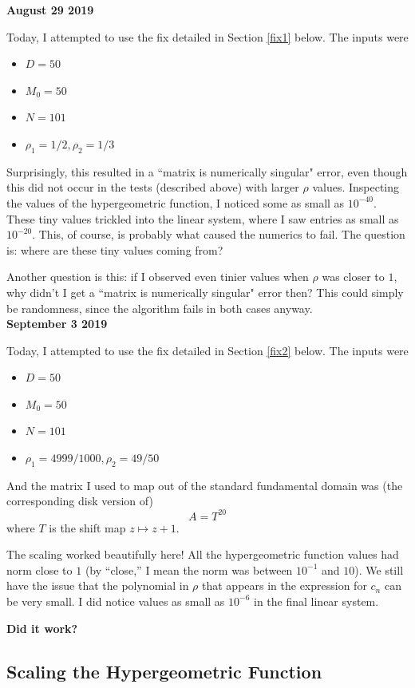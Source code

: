 \documentclass[]{article}
\begin{document}
\noindent \textbf{August 29 2019}

Today, I attempted to use the fix detailed in Section \ref{fix1} below.
The inputs were
\begin{itemize}
	\item $D = 50$
	\item $M_0 = 50$
	\item $N = 101$
	\item $\rho_1 = 1/2, \rho_2 = 1/3$
\end{itemize}
Surprisingly, this resulted in a ``matrix is numerically singular" error, even though this did not occur in the tests (described above) with larger $\rho$ values.
Inspecting the values of the hypergeometric function, I noticed some as small as $10^{-40}$.
These tiny values trickled into the linear system, where I saw entries as small as $10^{-20}$.
This, of course, is probably what caused the numerics to fail.
The question is: where are these tiny values coming from?

Another question is this: if I observed even tinier values when $\rho$ was closer to $1$, why didn't I get a ``matrix is numerically singular" error then?
This could simply be randomness, since the algorithm fails in both cases anyway.
\\

\noindent \textbf{September 3 2019}

Today, I attempted to use the fix detailed in Section \ref{fix2} below.
The inputs were
\begin{itemize}
	\item $D = 50$
	\item $M_0 = 50$
	\item $N = 101$
	\item $\rho_1 = 4999/1000, \rho_2 = 49/50$
\end{itemize}
And the matrix I used to map out of the standard fundamental domain was (the corresponding disk version of)
$$
A = T^{20}
$$
where $T$ is the shift map $z \mapsto z+1$.

The scaling worked beautifully here!
All the hypergeometric function values had norm close to $1$ (by ``close,'' I mean the norm was between $10^{-1}$ and $10$).
We still have the issue that the polynomial in $\rho$ that appears in the expression for $c_n$ can be very small.
I did notice values as small as $10^{-6}$ in the final linear system.

\textbf{Did it work?}

\subsection{Scaling the Hypergeometric Function}\label{scaleSect}
\end{document}

